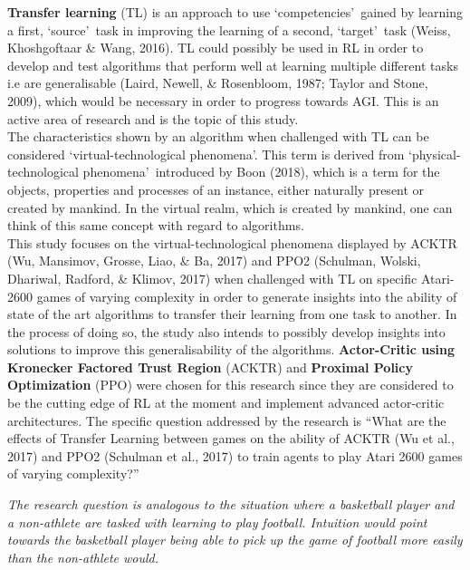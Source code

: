 \textbf{Transfer learning} (TL) is an approach to use \lq competencies\rq \ gained by learning a first, \lq source\rq \ task in improving the learning of a second, \lq target\rq \ task (Weiss, Khoshgoftaar \& Wang, 2016). TL could possibly be used in RL in order to develop and test algorithms that perform well at learning multiple different tasks i.e are generalisable (Laird, Newell, \& Rosenbloom, 1987; Taylor and Stone, 2009), which would be necessary in order to progress towards AGI. This is an active area of research and is the topic of this study. 
\\
The characteristics shown by an algorithm when challenged with TL can be considered \lq virtual-technological phenomena\rq . This term is derived from \lq physical-technological phenomena\rq \, introduced by Boon (2018), which is a term for the objects, properties and processes of an instance, either naturally present or created by mankind. In the virtual realm, which is created by mankind, one can think of this same concept with regard to algorithms.
\\
This study focuses on the virtual-technological phenomena displayed by ACKTR (Wu, Mansimov, Grosse, Liao, \& Ba, 2017) and PPO2 (Schulman, Wolski, Dhariwal, Radford, \& Klimov, 2017) when challenged with TL on specific Atari-2600 games of varying complexity in order to generate insights into the ability of state of the art algorithms to transfer their learning from one task to another. In the process of doing so, the study also intends to possibly develop insights into solutions to improve this generalisability of the algorithms. \textbf{Actor-Critic using Kronecker Factored Trust Region} (ACKTR) and \textbf{Proximal Policy Optimization} (PPO) were chosen for this research since they are considered to be the cutting edge of RL at the moment and implement advanced actor-critic architectures. The specific question addressed by the research is ``What are the effects of Transfer Learning between games on the ability of ACKTR (Wu et al., 2017) and PPO2 (Schulman et al., 2017) to train agents to play Atari 2600 games of varying complexity?''

\textit{The research question is analogous to the situation where a basketball player and a non-athlete are tasked with learning to play football. Intuition would point towards the basketball player being able to pick up the game of football more easily than the non-athlete would. }


